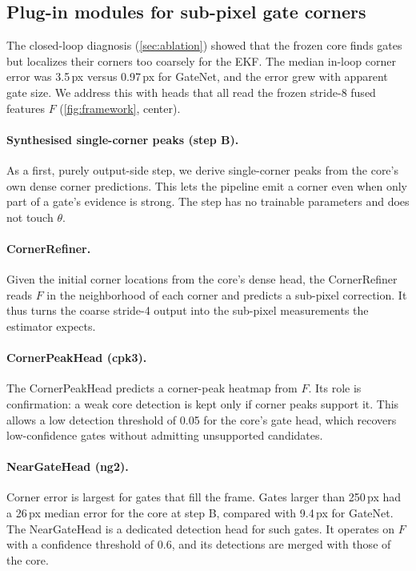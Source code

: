 \documentclass[10pt,twocolumn,letterpaper]{article}
\begin{document}
\subsection{Plug-in modules for sub-pixel gate corners}
\label{sec:modules}
The closed-loop diagnosis (\cref{sec:ablation}) showed that the frozen core finds gates but localizes their corners too coarsely for the EKF. The median in-loop corner error was 3.5\,px versus 0.97\,px for GateNet, and the error grew with apparent gate size. We address this with heads that all read the frozen stride-8 fused features $F$ (\cref{fig:framework}, center).

\paragraph{Synthesised single-corner peaks (step B).}
As a first, purely output-side step, we derive single-corner peaks from the core's own dense corner predictions. This lets the pipeline emit a corner even when only part of a gate's evidence is strong. The step has no trainable parameters and does not touch $\theta$.

\paragraph{CornerRefiner.}
Given the initial corner locations from the core's dense head, the CornerRefiner reads $F$ in the neighborhood of each corner and predicts a sub-pixel correction. It thus turns the coarse stride-4 output into the sub-pixel measurements the estimator expects.

\paragraph{CornerPeakHead (cpk3).}
The CornerPeakHead predicts a corner-peak heatmap from $F$. Its role is confirmation: a weak core detection is kept only if corner peaks support it. This allows a low detection threshold of 0.05 for the core's gate head, which recovers low-confidence gates without admitting unsupported candidates.

\paragraph{NearGateHead (ng2).}
Corner error is largest for gates that fill the frame. Gates larger than 250\,px had a 26\,px median error for the core at step B, compared with 9.4\,px for GateNet. The NearGateHead is a dedicated detection head for such gates. It operates on $F$ with a confidence threshold of 0.6, and its detections are merged with those of the core.
\end{document}
